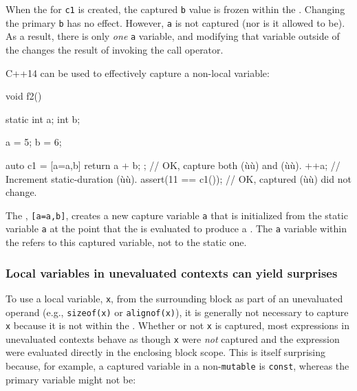 When the  for \lstinline!c1! is created, the
captured \lstinline!b! value is frozen within the .
Changing the primary \lstinline!b! has no effect. However, \lstinline!a! is
not captured (nor is it allowed to be). As a result, there is only
\emph{one} \lstinline!a! variable, and modifying that variable outside of
the  changes the result of invoking the call
operator.

C++14  can be used to effectively capture a
non-local variable:

\begin{emcppslisting}
void f2()
{
    static int a;
    int        b;

    a = 5;
    b = 6;

    auto c1 = [a=a,b]{ return a + b; };  // OK, capture both (ù{}ù) and (ù{}ù).
    ++a;                                 // Increment static-duration (ù{}ù).
    assert(11 == c1());                  // OK, captured (ù{}ù) did not change.
}
\end{emcppslisting}
    

The , \lstinline![a=a,b]!, creates a new capture
variable \lstinline!a! that is initialized from the static variable
\lstinline!a! at the point that the  is evaluated
to produce a . The \lstinline!a! variable within the
 refers to this captured variable, not to the static
one.

\subsubsection[Local variables in unevaluated contexts can yield surprises]{Local variables in unevaluated contexts can yield surprises}\label{local-variables-in-unevaluated-contexts-can-yield-surprises}

To use a local variable, \lstinline!x!, from the surrounding block as part
of an unevaluated operand (e.g., \lstinline!sizeof(x)! or
\lstinline!alignof(x)!), it is generally not necessary to capture
\lstinline!x! because it is not  within the . Whether or not \lstinline!x! is captured, most expressions in
unevaluated contexts behave as though \lstinline!x! were \emph{not}
captured and the expression were evaluated directly in the enclosing
block scope. This is itself surprising because, for example, a captured
variable in a non-\lstinline!mutable!  is
\lstinline!const!, whereas the primary variable might not be:

